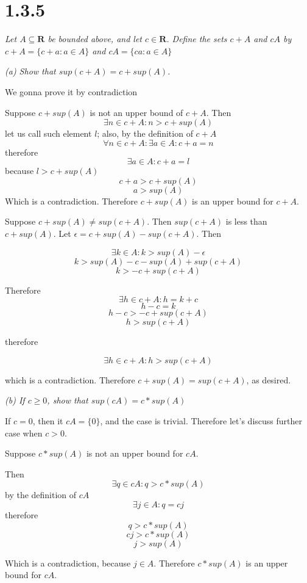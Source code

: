 \documentclass[11pt,oneside,titlepage]{book}
\begin{document}
\section*{1.3.5}
\textit{Let $A \subseteq \textbf{R}$ be bounded above, and let $c \in
  \textbf{R}$. Define the sets $c + A$ and $cA$ by $c + A = \{c + a: a \in A\}$
  and  $cA = \{ca: a \in A\}$
}

\textit{(a) Show that $sup(c + A) = c + sup(A)$.}


We gonna prove it by contradiction

Suppose $c + sup(A)$ is not an upper bound of $c + A$. Then
$$\exists n \in c + A: n > c + sup(A)$$
let us call such element $l$;
also, by the definition of $c + A$
$$\forall n \in c + A : \exists a \in A: c + a = n$$
therefore
$$\exists a \in A: c + a = l$$
because $l > c + sup(A)$
$$c + a > c + sup(A)$$
$$a > sup(A)$$
Which is a contradiction. Therefore $c + sup(A)$ is an upper bound for $c + A$.

Suppose $c + sup(A) \neq sup(c + A)$. Then $sup(c + A)$ is less
than $c + sup(A)$. Let $\epsilon = c + sup(A) - sup(c + A)$. Then

$$\exists k \in A: k > sup(A) - \epsilon$$
$$k > sup(A) - c - sup(A) + sup(c + A)$$
$$k > - c  + sup(c + A)$$

Therefore
$$\exists h \in c + A: h = k + c$$
$$h - c = k$$
$$h - c >  -c + sup(c + A)$$
$$h > sup(c + A)$$

therefore

$$\exists h \in c + A: h > sup(c + A)$$

which is a contradiction. Therefore $c + sup(A) = sup(c + A)$, as desired.

\textit{(b) If $c \geq 0$, show that $sup(cA) = c * sup(A)$}

If $c = 0$, then it $cA = \{0\}$, and the case is trivial. Therefore let's
discuss further case when $c > 0$.

Suppose $c * sup(A)$ is not an upper bound for $cA$.

Then
$$\exists q \in cA: q > c * sup(A)$$
by the definition of $cA$
$$\exists j \in A: q = cj$$
therefore
$$q > c * sup(A)$$
$$cj > c * sup(A)$$
$$j > sup(A)$$

Which is a contradiction, because $j \in A$. Therefore $c * sup(A)$ is an
upper bound for $cA$.
\end{document}
